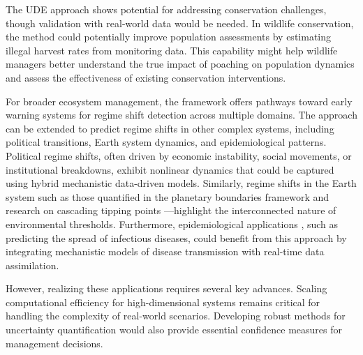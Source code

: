 \documentclass[openacc]{rsproca_new}%
\begin{document}

The UDE approach shows potential for addressing conservation challenges, though validation with real-world data would be needed. In wildlife conservation, the method could potentially improve population assessments by estimating illegal harvest rates from monitoring data. This capability might help wildlife managers better understand the true impact of poaching on population dynamics and assess the effectiveness of existing conservation interventions.

For broader ecosystem management, the framework offers pathways toward early warning systems for regime shift detection across multiple domains. The approach can be extended to predict regime shifts in other complex systems, including political transitions, Earth system dynamics, and epidemiological patterns. Political regime shifts, often driven by economic instability, social movements, or institutional breakdowns, exhibit nonlinear dynamics that could be captured using hybrid mechanistic data-driven models. Similarly, regime shifts in the Earth system such as those quantified in the planetary boundaries framework \cite{rockstrom2009safe, steffen2015planetary} and research on cascading tipping points \cite{rocha2018cascading}—highlight the interconnected nature of environmental thresholds. Furthermore, epidemiological applications \cite{brauer2019mathematical}, such as predicting the spread of infectious diseases, could benefit from this approach by integrating mechanistic models of disease transmission with real-time data assimilation.

However, realizing these applications requires several key advances. Scaling computational efficiency for high-dimensional systems remains critical for handling the complexity of real-world scenarios. Developing robust methods for uncertainty quantification would also provide essential confidence measures for management decisions. 

\end{document}
